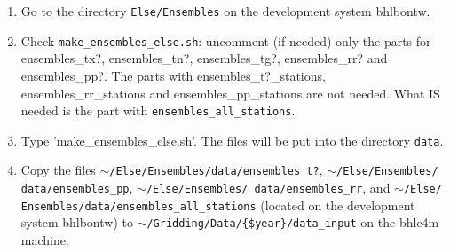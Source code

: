 \documentclass[a4paper]{article}
\begin{document}
\begin{enumerate}
\item Go to the directory \texttt{Else/Ensembles} on the development
system bhlbontw.
\item Check \texttt{make\_ensembles\_else.sh}: uncomment (if needed)
  only the parts for ensembles\_tx?, ensembles\_tn?, ensembles\_tg?,
  ensembles\_rr? and ensembles\_pp?. The parts with
  ensembles\_t?\_stations, ensembles\_rr\_stations and
  ensembles\_pp\_stations are not needed. What IS needed is the part
  with \texttt{ensembles\_all\_stations}.
\item Type 'make\_ensembles\_else.sh'. The files will be put into the
  directory \texttt{data}.
\item Copy the files
  \texttt{$\sim$/Else/Ensembles/data/ensembles\_t?},
  \texttt{$\sim$/Else/Ensembles/ data/ensembles\_pp},
  \texttt{$\sim$/Else/Ensembles/ data/ensembles\_rr}, and 
  \texttt{$\sim$/Else/ Ensembles/data/ensembles\_all\_stations}
  (located on the development system bhlbontw) to
  \texttt{$\sim$/Gridding/Data/\{\$year\}/data\_input} on
  the bhle4m machine.\\

\smallskip 


\end{enumerate}
\end{document}
